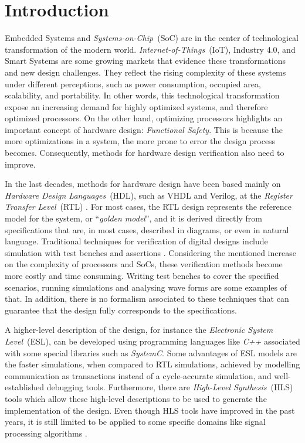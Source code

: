 \chapter{Introduction}

Embedded Systems and \textit{Systems-on-Chip}~(SoC) are in the center of technological transformation of the modern world. \textit {Internet-of-Things}~(IoT), Industry 4.0, and Smart Systems are some growing markets that evidence these transformations and new design challenges. They reflect the rising complexity of these systems under different perceptions, such as power consumption, occupied area, scalability, and portability. In other words, this technological transformation expose an increasing demand for highly optimized systems, and therefore optimized processors. On the other hand, optimizing processors highlights an important concept of hardware design: \textit{Functional Safety}. This is because the more optimizations in a system, the more prone to error the design process becomes. Consequently, methods for hardware design verification also need to improve.

In the last decades, methods for hardware design have been based mainly on \textit{Hardware Design Languages}~(HDL), such as VHDL and Verilog, at the \textit{Register Transfer Level}~(RTL) \cite{paper-pdd}. For most cases, the RTL design represents the reference model for the system, or “\textit{golden model}”, and it is derived directly from specifications that are, in most cases, described in diagrams, or even in natural language. Traditional techniques for verification of digital designs include simulation with test benches and assertions \cite{paper-symbolic}. Considering the mentioned increase on the complexity of processors and SoCs, these verification methods become more costly and time consuming. Writing test benches to cover the specified scenarios, running simulations and analysing wave forms are some examples of that. In addition, there is no formalism associated to these techniques that can guarantee that the design fully corresponds to the specifications.

A higher-level description of the design, for instance the \textit{Electronic System Level}~(ESL), can be developed using programming languages like \textit{C++} associated with some special libraries such as \textit{SystemC}. Some advantages of ESL models are the faster simulations, when compared to RTL simulations, achieved by modelling communication as transactions instead of a cycle-accurate simulation, and well-established debugging tools. Furthermore, there are \textit{High-Level Synthesis}~(HLS) tools which allow these high-level descriptions to be used to generate the implementation of the design. Even though HLS tools have improved in the past years, it is still limited to be applied to some specific domains like signal processing algorithms \cite{paper-pdd}. 

